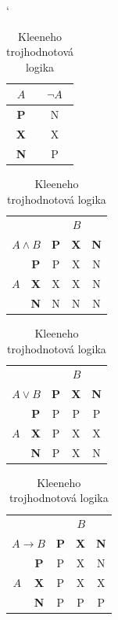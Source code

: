 \documentclass[11pt,a4paper,titlepage]{article}
\begin{document}
		\begin{table}[h]
			\begin{center}
				\catcode`
				\begin{tabular}{|c|c|} \hline
					$A$ & $\neg A$ \\ \hline
					\textbf{P} & N \\ \hline
					\textbf{X} & X \\ \hline
					\textbf{N} & P \\ \hline
				\end{tabular}
				\begin{tabular}{|c|c|c|c|c|} \hline
					\multicolumn{2}{|c|}{} & \multicolumn{3}{|c|}{$B$} \\ \cline{3-5}
					\multicolumn{2}{|c|}{$A \wedge B$} & \textbf{P} & \textbf{X} & \textbf{N} \\ \hline
					& \textbf{P} & P & X & N \\ \cline{2-5}
					$A$ & \textbf{X} & X & X & N \\ \cline{2-5}
					& \textbf{N} & N & N & N \\ \hline
				\end{tabular}
				\begin{tabular}{|c|c|c|c|c|} \hline
					\multicolumn{2}{|c|}{} & \multicolumn{3}{|c|}{$B$} \\ \cline{3-5}
					\multicolumn{2}{|c|}{$A \vee B$} & \textbf{P} & \textbf{X} & \textbf{N}\\ \hline
					& \textbf{P} & P & P & P \\ \cline{2-5}
					$A$ & \textbf{X} & P & X & X \\ \cline{2-5}
					& \textbf{N} & P & X & N \\ \hline
				\end{tabular}
				\begin{tabular}{|c|c|c|c|c|} \hline
					\multicolumn{2}{|c|}{} & \multicolumn{3}{|c|}{$B$} \\ \cline{3-5}
					\multicolumn{2}{|c|}{$A \rightarrow B$} & \textbf{P} & \textbf{X} & \textbf{N} \\ \hline
					& \textbf{P} & P & X & N \\ \cline{2-5}
					$A$ & \textbf{X} & P & X & X \\ \cline{2-5}
					& \textbf{N} & P & P & P \\ \hline
				\end{tabular}
				\caption{Kleeneho trojhodnotová logika}
				\label{tabulka2}
			\end{center}
		\end{table}
\end{document}
